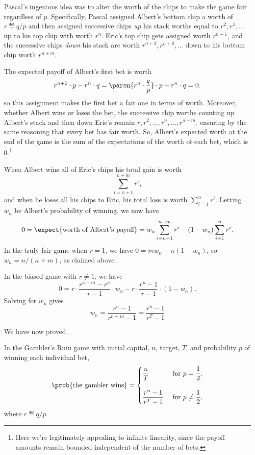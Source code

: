 Pascal's ingenious idea was to alter the worth of the chips to make
the game fair regardless of $p$.  Specifically, Pascal assigned
Albert's bottom chip a worth of $r \eqdef q/p$ and then assigned
successive chips \emph{up} his stack worths equal to
$r^{2},r^{3},\dots$ up to his top chip with worth $r^n$.  Eric's top
chip gets assigned worth $r^{n+1}$, and the successive chips
\emph{down} his stack are worth $r^{n+2},r^{n+3},\dots$ down to
his bottom chip worth $r^{n+m}$.

The expected payoff of Albert's first bet is worth
\[
r^{n+1}\cdot p - r^n\cdot q
   = \paren{r^n \cdot \frac{q}{p}} \cdot p - r^n\cdot q = 0.
\]
so this assignment makes the first bet a fair one in terms of worth.
Moreover, whether Albert wins or loses the bet, the successive chip
worths counting up Albert's stack and then down Eric's remain
$r,r^2,\dots,r^n,\dots,r^{n+m}$, ensuring by the same reasoning that
every bet has fair worth.  So, Albert's expected worth at the end of
the game is the sum of the expectations of the worth of each bet,
which is 0.\footnote{Here we're legitimately appealing to infinite
  linearity, since the payoff amounts remain bounded independent of
  the number of bets.}

When Albert wins all of Eric's chips his total gain is worth
\[
\sum_{i=n+1}^{n+m} r^i,
\]
and when he loses all his chips to Eric, his total loss is worth
$\sum_{i=1}^n r^i$.  Letting $w_n$ be Albert's probability of winning,
we now have
\[
0 = \expect{\text{worth of Albert's payoff}} =
 w_n \sum_{i=n+1}^{n+m} r^i - (1-w_n)\sum_{i=1}^n r^i.
\]
In the truly fair game when $r=1$, we have $0 = mw_n - n(1-w_n)$, so
$w_n = n/(n+m)$, as claimed above.

In the biased game with $r\neq 1$, we have
\[
0 =   r \cdot \frac{r^{n+m} - r^{n}}{r-1} \cdot w_n
        - r \cdot \frac{r^{n}-1}{r-1}\cdot (1-w_n).
\]
Solving for $w_n$ gives
\begin{equation}\label{LN12:wnsol}
w_n = \frac{r^n-1}{r^{n+m} -1} = \frac{r^n-1}{r^{T} -1}
\end{equation}

We have now proved
\begin{theorem}\label{thm:gamblerruin}
  In the Gambler's Ruin game with initial capital, $n$, target, $T$,
  and probability $p$ of winning each individual bet,
\begin{equation}\label{eq:gamblerruin}
\prob{\text{the gambler wins}} =
\begin{cases}
 \dfrac{n}{T} & \text{ for } p = \dfrac{1}{2},\\
              &   \\
 \dfrac{r^n-1}{r^{T} -1} & \text{ for } p \neq \dfrac{1}{2},
\end{cases}
\end{equation}
where $r \eqdef q/p$.
\end{theorem}

